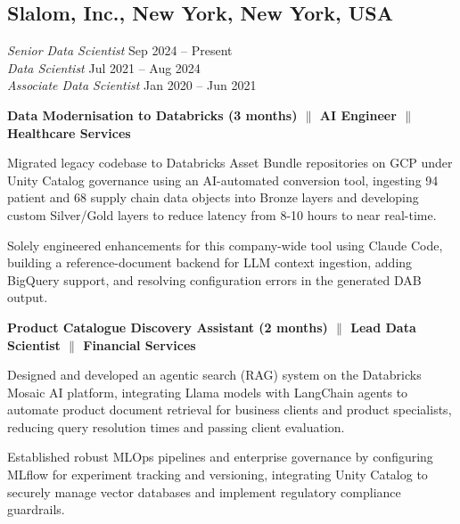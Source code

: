 

\subsection{{Slalom, Inc., New York, New York, USA}}
{\textit{Senior Data Scientist}} \hfill Sep 2024 -- Present
\\
{\textit{Data Scientist}} \hfill Jul 2021 -- Aug 2024
\\
{\textit{Associate Data Scientist}} \hfill Jan 2020 -- Jun 2021


\vspace{0.05cm}

{\textbf{Data Modernisation to Databricks (3 months) $\|$ AI Engineer $\|$ Healthcare Services}}
\begin{zitemize}
\item Migrated legacy codebase to Databricks Asset Bundle repositories on GCP under Unity Catalog governance using an AI-automated conversion tool, ingesting 94 patient and 68 supply chain data objects into Bronze layers and developing custom Silver/Gold layers to reduce latency from 8-10 hours to near real-time.
\item Solely engineered enhancements for this company-wide tool using Claude Code, building a reference-document backend for LLM context ingestion, adding BigQuery support, and resolving configuration errors in the generated DAB output.
\end{zitemize}

{\textbf{Product Catalogue Discovery Assistant (2 months) $\|$ Lead Data Scientist $\|$ Financial Services}}
\begin{zitemize}
\item Designed and developed an agentic search (RAG) system on the Databricks Mosaic AI platform, integrating Llama models with LangChain agents to automate product document retrieval for business clients and product specialists, reducing query resolution times and passing client evaluation.
\item Established robust MLOps pipelines and enterprise governance by configuring MLflow for experiment tracking and versioning, integrating Unity Catalog to securely manage vector databases and implement regulatory compliance guardrails.
\end{zitemize}

